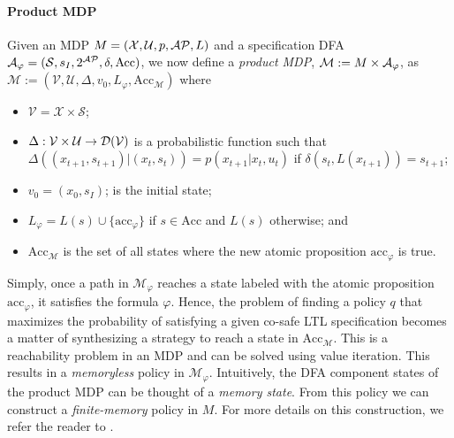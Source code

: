 \paragraph*{Product MDP}
Given an MDP $M=(\mathcal{X},\mathcal{U},p,\mathcal{AP},L)$ and a specification DFA
$\mathcal{A}_{\varphi} = (\mathcal{S},s_I,2^{\mathcal{AP}}, \delta,\textrm{Acc})$, we now define a \emph{product
MDP}, $\mathcal{M} := M \times\mathcal{A}_{\varphi}$, as $\mathcal{M}
:= (\mathcal{V},\mathcal{U}, \Delta,v_0, L_{\varphi},\textrm{Acc}_{\mathcal{M}})$ where
\begin{itemize}
	\item $\mathcal{V} = \mathcal{X} \times \mathcal{S}$;
	\item $\Delta: \mathcal{V} \times \mathcal{U} \rightarrow \mathcal{D}(\mathcal{V})$ is a probabilistic function such that $\Delta\left((x_{t+1},s_{t+1})\vert (x_t,s_t)\right) = p(x_{t+1} \vert x_t,u_t ) $ if $\delta(s_t,L(x_{t+1}))
		= s_{t+1}$;
	\item $v_0 = (x_0,s_I)$; is the initial state;
	\item $L_{\varphi} = L(s) \cup \{\textrm{acc}_\varphi\}$ if $s \in \textrm{Acc}$ and $L(s)$ otherwise; and
	\item $\textrm{Acc}_{\mathcal{M}}$ is the set of all states where the new atomic proposition $\textrm{acc}_\varphi$ is true.
\end{itemize}
Simply, once a path in $\mathcal{M}_{\varphi}$ reaches a state labeled with the atomic proposition $\textrm{acc}_\varphi$, it satisfies the formula $\varphi$.  Hence, the problem of finding a policy $q$ that maximizes the probability of satisfying a given co-safe LTL specification becomes a matter of synthesizing a strategy to reach a state in $\textrm{Acc}_{\mathcal{M}}$. This is a reachability problem in an MDP and can be solved using value iteration. This results in a \emph{memoryless} policy in $\mathcal{M}_\varphi$. Intuitively, the DFA component states of the product MDP can be thought of a \emph{memory state}. From this policy we can construct a \emph{finite-memory} policy in $M$. For more details on this construction, we refer the reader to  \cite{forejt2011automated}.

